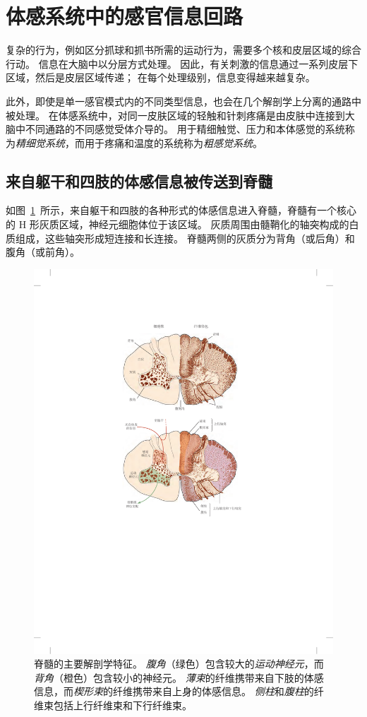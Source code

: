 \section{体感系统中的感官信息回路}

复杂的行为，例如区分抓球和抓书所需的运动行为，需要多个核和皮层区域的综合行动。
信息在大脑中以分层方式处理。
因此，有关刺激的信息通过一系列皮层下区域，然后是皮层区域传递； 
在每个处理级别，信息变得越来越复杂。


此外，即使是单一感官模式内的不同类型信息，也会在几个解剖学上分离的通路中被处理。
在体感系统中，对同一皮肤区域的轻触和针刺疼痛是由皮肤中连接到大脑中不同通路的不同感觉受体介导的。 
用于精细触觉、压力和本体感觉的系统称为\textit{精细觉系统}，而用于疼痛和温度的系统称为\textit{粗感觉系统}。



\subsection{来自躯干和四肢的体感信息被传送到脊髓}

如图~\ref{fig:4_3}~所示，来自躯干和四肢的各种形式的体感信息进入脊髓，脊髓有一个核心的 H 形灰质区域，神经元细胞体位于该区域。 
灰质周围由髓鞘化的轴突构成的白质组成，这些轴突形成短连接和长连接。
脊髓两侧的灰质分为背角（或后角）和腹角（或前角）。


\begin{figure}[htbp]
	\centering
	\includegraphics[width=0.7\linewidth]{chap04/fig_4_3}
	\caption{脊髓的主要解剖学特征。 
		\textit{腹角}（绿色）包含较大的\textit{运动神经元}，而\textit{背角}（橙色）包含较小的神经元。
		\textit{薄束}的纤维携带来自下肢的体感信息，而\textit{楔形束}的纤维携带来自上身的体感信息。
		\textit{侧柱}和\textit{腹柱}的纤维束包括上行纤维束和下行纤维束。}
	\label{fig:4_3}
\end{figure}



